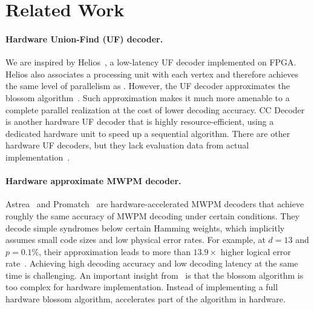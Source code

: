 \section{Related Work}
\label{sec:related}

\paragraph{Hardware Union-Find (UF) decoder.} 
We are inspired by Helios~\cite{liyanage2023qce}, a low-latency UF decoder implemented on FPGA.
Helios also associates a processing unit with each vertex and therefore achieves the same level of parallelism as \arch.
However, the UF decoder approximates the blossom algorithm~\cite{wu2022interpretation}.
Such approximation makes it much more amenable to a complete parallel realization at the cost of lower decoding accuracy. 
CC Decoder~\cite{barber2023realtime} is another hardware UF decoder that is highly resource-efficient, using a dedicated hardware unit to speed up a sequential algorithm.
There are other hardware UF decoders, but they lack evaluation data from actual implementation~\cite{das2022afs}.

\paragraph{Hardware approximate MWPM decoder.}
Astrea~\cite{vittal2023astrea} and Promatch~\cite{alavisamani2024promatch} are hardware-accelerated MWPM decoders that achieve roughly the same accuracy of MWPM decoding under certain conditions.
They decode simple syndromes below certain Hamming weights, which implicitly assumes small code sizes and low physical error rates.
For example, at $d=13$ and $p=0.1\%$, their approximation leads to more than $13.9\times$ higher logical error rate~\cite{alavisamani2024promatch}.
Achieving high decoding accuracy and low decoding latency at the same time is challenging.
An important insight from~\cite{vittal2023astrea} is that the blossom algorithm is too complex for hardware implementation.
Instead of implementing a full hardware blossom algorithm, \system accelerates part of the algorithm in hardware.


